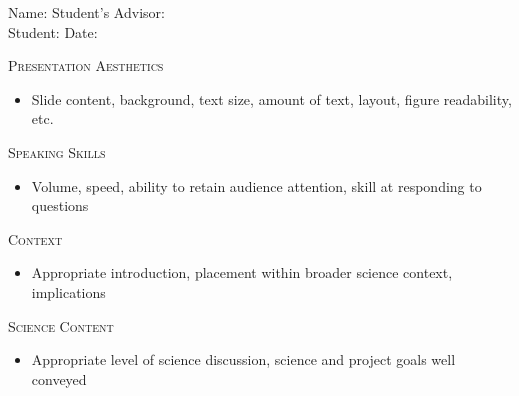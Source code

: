 \documentclass[12pt,onecolumn]{article}
\newcommand*{\showline}[1][2]{\makebox[#1in]{\hrulefill}}
\begin{document}
\baselineskip=18pt

{\large Name: \showline}\hspace{20pt}
{\large Student's Advisor: \showline}\\
\vspace{12pt}
{\large Student: \showline[2.5]}\hspace{20pt}
{\large Date: \showline[1.5]}
\vspace{16pt}

{\large\textsc{Presentation Aesthetics}}
\begin{itemize}
\item Slide content, background, text size, amount of text, layout, figure readability, etc.
\end{itemize}
\vspace{100pt}

{\large\textsc{Speaking Skills}}
\begin{itemize}
\item Volume, speed, ability to retain audience attention, skill at responding  to questions
\end{itemize}
\vspace{100pt}

{\large\textsc{Context}}
\begin{itemize}
\item Appropriate introduction, placement within broader science context, implications
\end{itemize}
\vspace{100pt}

{\large\textsc{Science Content}}
\begin{itemize}
\item Appropriate level of science discussion, science and project goals well conveyed
\end{itemize}
\end{document}
